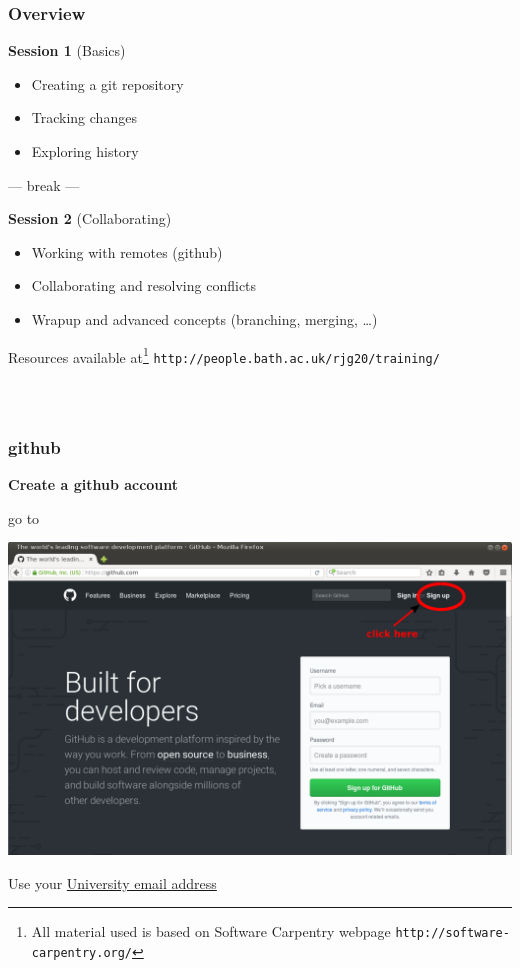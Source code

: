 \documentclass{beamer}
\begin{document}
\begin{frame}
  \frametitle{Overview}
  \textbf{\Large Session 1} (Basics) {\color{red}{13:45h - 15:00h}}
  \begin{itemize}
  \item Creating a git repository
  \item Tracking changes
  \item Exploring history
  \end{itemize}
  \vspace{-1ex}
  \begin{center}
  --- break ---
  \end{center}
  \vspace{-1ex}
  \textbf{\Large Session 2} (Collaborating) {\color{red}{15:30h - 17:00h}}
  \begin{itemize}
  \item Working with remotes (github)
  \item Collaborating and resolving conflicts
  \item Wrapup and advanced concepts (branching, merging, \dots)
  \end{itemize}
  \vspace{1ex}
  Resources available at\footnote{All material used is based on Software Carpentry webpage \texttt{http://software-carpentry.org/}}
 \texttt{http://people.bath.ac.uk/rjg20/training/}
\end{frame}


\begin{frame}
  \frametitle{${}^{}$}
\end{frame}


\begin{frame}
  \frametitle{github}
  \textbf{Create a github account}
  \begin{center}
    go to {}
  \end{center}
  \begin{center}
    \includegraphics[width=0.75\linewidth]{github.pdf}
  \end{center}
  Use your \underline{University email address}
\end{frame}
\end{document}
